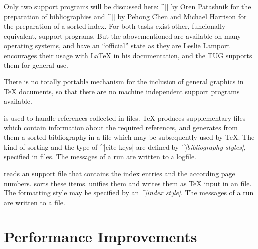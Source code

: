 Only two support programs will be discussed here: ^|\BibTeX{}| by
{\sc Oren Patashnik} for the preparation of bibliographies and
^|\MakeIndex{}| by {\sc Pehong Chen} and {\sc Michael Harrison} for
the preparation of a sorted index. For both tasks exist other,
funcionally equivalent, support programs. But the abovementioned are
available on many operating systems, and have an ``official'' state
as they are {\sc Leslie Lamport} encourages their usage with
\LaTeX{} in his documentation, and the TUG supports them for general use.

There is no totally portable mechanism for the inclusion of general
graphics in \TeX{} documents, so that there are no machine independent
support programs available.

\BibTeX{} is used to handle references collected in 
files. \TeX{} produces supplementary files which contain information
about the required references, and \BibTeX{} generates from them a
sorted bibliography in a  file which may be subsequently
used by \TeX{}. The kind of sorting and the type of ^|cite keys| are
defined by {\it ^|bibliography styles|\/},  specified in 
files. The messages of a \BibTeX{} run are written to a 
logfile.

\MakeIndex{} reads an  support file that contains the index
entries and the according page numbers, sorts these items, unifies
them and writes them as \TeX{} input in an  file. The
formatting style may be specified by an {\it ^|index style|}. The
messages of a \MakeIndex{} run are written to a  file.



\section{Performance Improvements}

